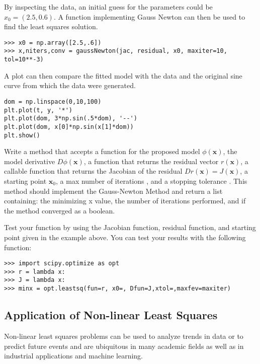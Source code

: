 By inspecting the data, an initial guess for the parameters could be $x_0 = (2.5, 0.6)$.
A function implementing Gauss Newton can then be used to find the least squares solution.

\begin{lstlisting}
>>> x0 = np.array([2.5,.6])
>>> x,niters,conv = gaussNewton(jac, residual, x0, maxiter=10, tol=10**-3)
\end{lstlisting}

A plot can then compare the fitted model with the data and the original sine curve from which the data were generated.

\begin{lstlisting}
dom = np.linspace(0,10,100)
plt.plot(t, y, '*')
plt.plot(dom, 3*np.sin(.5*dom), '--')
plt.plot(dom, x[0]*np.sin(x[1]*dom))
plt.show()
\end{lstlisting}


\begin{problem}
Write a method that accepts a function for the proposed model $\phi(\mathbf{x})$, the model derivative $D\phi(\mathbf{x})$, a function that returns the residual vector $r(\mathbf{x})$, a callable function that returns the Jacobian of the residual $Dr(\mathbf{x}) = J(\mathbf{x})$, a starting point $\mathbf{x}_0$, a max number of iterations , and a stopping tolerance .
This method should implement the Gauss-Newton Method and return a list containing: the minimizing x value, the number of iterations performed, and if the method converged as a boolean.

Test your function by using the Jacobian function, residual function, and starting point given in the example above.
You can test your results with the following function:
\begin{lstlisting}
>>> import scipy.optimize as opt
>>> r = lambda x:
>>> J = lambda x:
>>> minx = opt.leastsq(fun=r, x0=, Dfun=J,xtol=,maxfev=maxiter)
\end{lstlisting} 
\end{problem}

\subsection*{Application of Non-linear Least Squares}
Non-linear least squares problems can be used to analyze trends in data or to predict future events and are ubiquitous in many academic fields as well as in industrial applications and machine learning.

